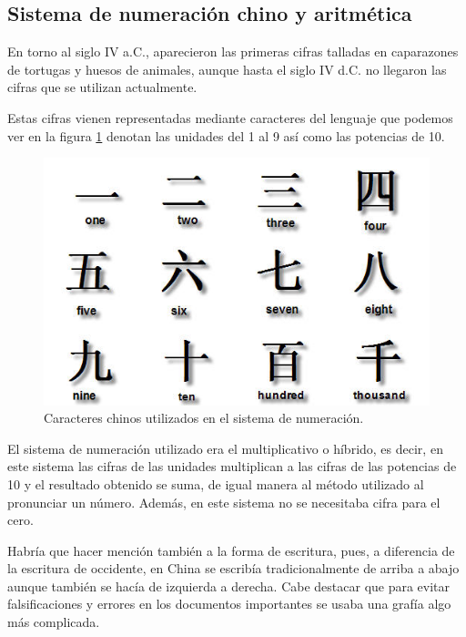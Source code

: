 \documentclass[a4paper, 11pt]{article}
\begin{document}
	\subsection{Sistema de numeración chino y aritmética}
		En torno al siglo IV a.C., aparecieron las primeras cifras talladas en caparazones de tortugas y huesos de animales,
		aunque hasta el siglo IV d.C. no llegaron las cifras que se utilizan actualmente.
		
		Estas cifras vienen representadas mediante caracteres del lenguaje que podemos ver en la figura \ref{fig:ch_numbers}
		denotan las unidades del 1 al 9 así como las potencias de 10.
		
		\begin{figure}[!ht]
			\centering
			\includegraphics[width = 14cm]{chinese_numbers.jpg}
			\caption{Caracteres chinos utilizados en el sistema de numeración.}
			\label{fig:ch_numbers}
		\end{figure}
					
		El sistema de numeración utilizado era el multiplicativo o híbrido, es decir, en este sistema las cifras de las
		unidades multiplican a las cifras de las potencias de 10 y el resultado obtenido se suma, de igual manera al método
		utilizado al pronunciar un número. Además, en este sistema no se necesitaba cifra para el cero.
		
		Habría que hacer mención también a la forma de escritura, pues, a diferencia de la escritura de occidente, en
		China se escribía tradicionalmente de arriba a abajo aunque también se hacía de izquierda a derecha. Cabe destacar
		que para evitar falsificaciones y errores en los documentos importantes se usaba una grafía algo más complicada.
	
\end{document}
